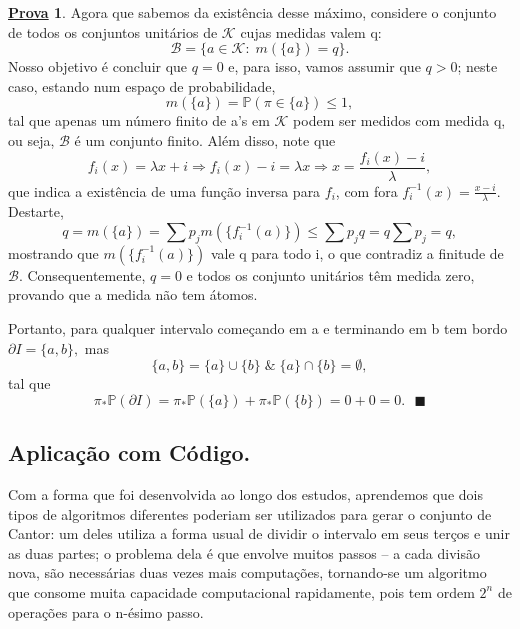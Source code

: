 \documentclass[12pt]{article}
\theoremstyle{definition}
\newtheorem*{proof*}{\underline{Prova}}
\renewcommand\qedsymbol{$\blacksquare$}
\begin{document}
\begin{proof*}
	Agora que sabemos da existência desse máximo, considere o conjunto de todos os conjuntos unitários de \(\mathcal{K}\) cujas medidas valem q:
	\[
		\mathcal{B} = \{a\in \mathcal{K}:\; m(\{a\}) = q\}.
	\]
	Nosso objetivo é concluir que \(q=0\) e, para isso, vamos assumir que \(q > 0\); neste caso, estando num espaço de probabilidade,
	\[
		m(\{a\}) = \mathbb{P}(\pi \in \{a\})\leq 1,
	\]
	tal que apenas um número finito de a's em \(\mathcal{K}\) podem ser medidos com medida q, ou seja, \(\mathcal{B}\) é um conjunto finito. Além disso, note que
	\[
		f_{i}(x) = \lambda x + i \Rightarrow f_{i}(x) -i = \lambda x \Rightarrow x = \frac{f_{i}(x) - i}{\lambda },
	\]
	que indica a existência de uma função inversa para \(f_{i}\), com fora \(f_{i}^{-1}(x) = \frac{x-i}{\lambda }.\) Destarte,
	\[
		q = m(\{a\}) = \sum p_{j}m(\{f_{i}^{-1}(a)\}) \leq \sum p_{j}q = q \sum p_{j} = q,
	\]
	mostrando que \(m(\{f_{i}^{-1}(a)\})\) vale q para todo i, o que contradiz a finitude de \(\mathcal{B}.\) Consequentemente, \(q = 0\) e todos os conjunto unitários têm medida zero, provando que a medida não tem átomos.

	Portanto, para qualquer intervalo começando em a e terminando em b tem bordo \(\partial I = \{a, b\},\) mas
	\[
		\{a, b\} = \{a\} \cup \{b\} \;\&\; \{a\}\cap \{b\} = \emptyset ,
	\]
	tal que
	\[
		\pi_{*}\mathbb{P}(\partial I) = \pi_{*}\mathbb{P}(\{a\}) + \pi_{*}\mathbb{P}(\{b\}) = 0+0 = 0. \text{ \qedsymbol}
	\]
\end{proof*}


\subsection*{Aplicação com Código.}
Com a forma que foi desenvolvida ao longo dos estudos, aprendemos que dois tipos de algoritmos diferentes poderiam ser utilizados para gerar o conjunto de Cantor: um deles utiliza a forma usual de dividir o intervalo em seus terços e unir as duas partes; o problema dela é que envolve muitos passos -- a cada divisão nova, são necessárias duas vezes mais computações, tornando-se um algoritmo que consome muita capacidade computacional rapidamente, pois tem ordem \(2^{n}\) de operações para o n-ésimo passo.
\end{document}

